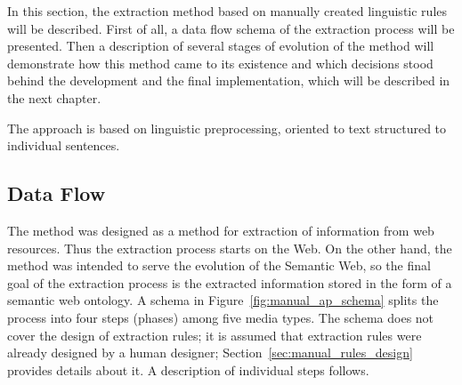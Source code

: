 

In this section, the extraction method based on manually created linguistic rules will be described. First of all, a data flow schema of the extraction process will be presented. Then a description of several stages of evolution of the method will demonstrate how this method came to its existence and which decisions stood behind the development and the final implementation, which will be described in the next chapter.

The approach is based on linguistic preprocessing, oriented to text structured to individual sentences. 



\subsection{Data Flow} \label{sec:manual_data_flow}




The method was designed as a method for extraction of information from web resources. Thus the extraction process starts on the Web. On the other hand, the method was intended to serve the evolution of the Semantic Web, so the final goal of the extraction process is the extracted information stored in the form of a semantic web ontology. A schema in Figure~\ref{fig:manual_ap_schema} splits the process into four steps (phases) among five media types. The schema does not cover the design of extraction rules; it is assumed that extraction rules were already designed by a human designer; Section~\ref{sec:manual_rules_design} provides details about it. A description of individual steps follows. 


